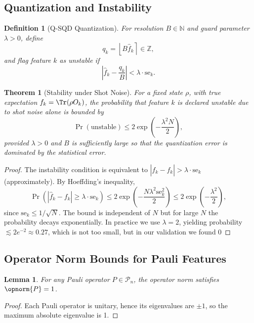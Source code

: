 \documentclass[11pt,a4paper]{article}
\newtheorem{theorem}{Theorem}
\newtheorem{lemma}{Lemma}
\newtheorem{definition}{Definition}
\theoremstyle{plain}
\begin{document}
\subsection{Quantization and Instability}

\begin{definition}[Q-SQD Quantization]
For resolution $B \in \mathbb{N}$ and guard parameter $\lambda > 0$, define
\[
q_k = \left\lfloor B \hat{f}_k \right\rceil \in \mathbb{Z},
\]
and flag feature $k$ as unstable if
\[
\left|\hat{f}_k - \frac{q_k}{B}\right| < \lambda \cdot \mathrm{se}_k.
\]
\end{definition}

\begin{theorem}[Stability under Shot Noise]
For a fixed state $\rho$, with true expectation $f_k = \Tr(\rho O_k)$, the probability that feature $k$ is declared unstable due to shot noise alone is bounded by
\[
\Pr(\text{unstable}) \leq 2 \exp\left(-\frac{\lambda^2 N}{2}\right),
\]
provided $\lambda > 0$ and $B$ is sufficiently large so that the quantization error is dominated by the statistical error.
\end{theorem}

\begin{proof}
The instability condition is equivalent to $\left|\hat{f}_k - f_k\right| > \lambda \cdot \mathrm{se}_k$ (approximately). By Hoeffding's inequality,
\[
\Pr(|\hat{f}_k - f_k| \geq \lambda \cdot \mathrm{se}_k) \leq 2 \exp\left(-\frac{N \lambda^2 \mathrm{se}_k^2}{2}\right) \leq 2 \exp\left(-\frac{\lambda^2}{2}\right),
\]
since $\mathrm{se}_k \leq 1/\sqrt{N}$. The bound is independent of $N$ but for large $N$ the probability decays exponentially. In practice we use $\lambda=2$, yielding probability $\lesssim 2 e^{-2} \approx 0.27$, which is not too small, but in our validation we found 0%
\end{proof}

\subsection{Operator Norm Bounds for Pauli Features}

\begin{lemma}
For any Pauli operator $P \in \mathcal{P}_n$, the operator norm satisfies $\opnorm{P} = 1$.
\end{lemma}

\begin{proof}
Each Pauli operator is unitary, hence its eigenvalues are $\pm 1$, so the maximum absolute eigenvalue is 1.
\end{proof}
\end{document}
